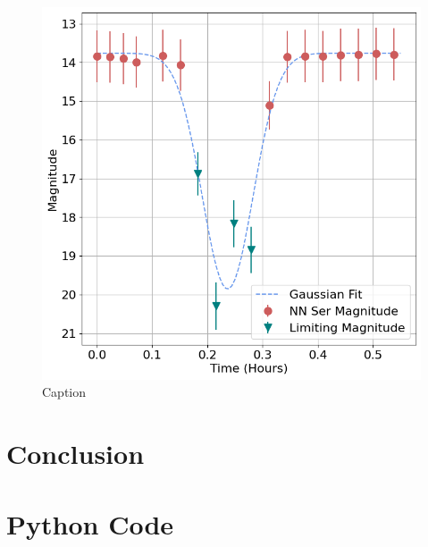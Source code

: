 \documentclass[%
reprint,
amsmath,amssymb,
aps,
]{revtex4-2}
\begin{document}
			\begin{figure}
				\includegraphics[width=\columnwidth]{lightcurve.png}
				\caption{\label{fig:lightcurve} Caption}
			\end{figure}

	\section{Conclusion}
		
	\newpage
		
	\newpage
	\appendix
		
	\section{Python Code}
		
		
		
\end{document}
